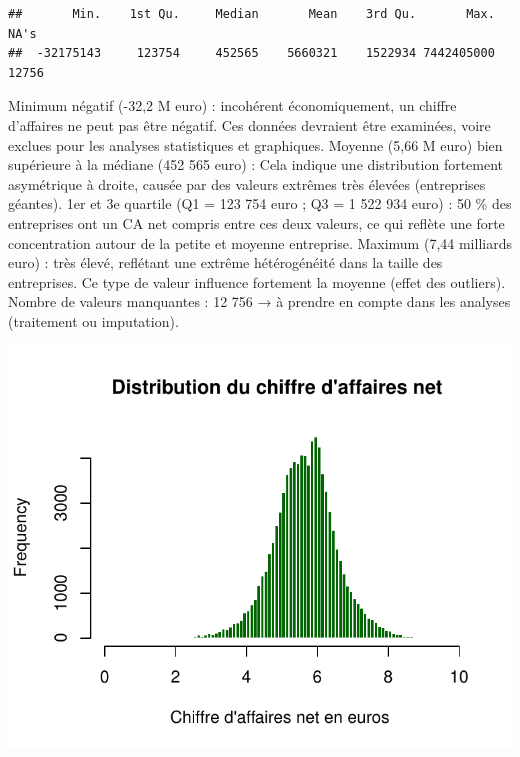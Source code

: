 \documentclass[mstat,12pt]{unswthesis}
\begin{document}
\medskip

\scriptsize

\begin{verbatim}
##       Min.    1st Qu.     Median       Mean    3rd Qu.       Max.       NA's 
##  -32175143     123754     452565    5660321    1522934 7442405000      12756
\end{verbatim}

\normalsize

\medskip

Minimum négatif (-32,2 M euro) : incohérent économiquement, un chiffre
d'affaires ne peut pas être négatif. Ces données devraient être
examinées, voire exclues pour les analyses statistiques et graphiques.
Moyenne (5,66 M euro) bien supérieure à la médiane (452 565 euro) : Cela
indique une distribution fortement asymétrique à droite, causée par des
valeurs extrêmes très élevées (entreprises géantes). 1er et 3e quartile
(Q1 = 123 754 euro ; Q3 = 1 522 934 euro) : 50 \% des entreprises ont un
CA net compris entre ces deux valeurs, ce qui reflète une forte
concentration autour de la petite et moyenne entreprise. Maximum (7,44
milliards euro) : très élevé, reflétant une extrême hétérogénéité dans
la taille des entreprises. Ce type de valeur influence fortement la
moyenne (effet des outliers). Nombre de valeurs manquantes : 12 756 → à
prendre en compte dans les analyses (traitement ou imputation).

\medskip

\includegraphics{scdon2-UPV-report-template_sansPython_files/figure-latex/unnamed-chunk-28-1.pdf}
\end{document}

